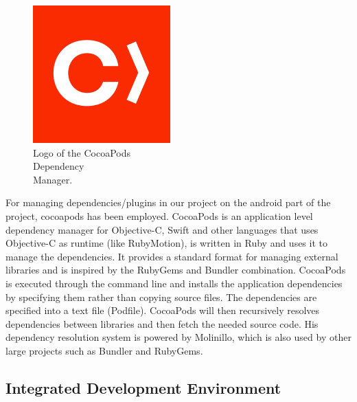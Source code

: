 \begin{figure} %
    \centering
    \includegraphics[width=\linewidth]{images/cocoapods.png}
    \caption{Logo of the CocoaPods\\Dependency\\Manager.}
\end{figure}

For managing dependencies/plugins in our project on the android part of the project, cocoapods has been employed. CocoaPods is an application level dependency manager for Objective-C, Swift and other languages that uses Objective-C as runtime (like RubyMotion), is written in Ruby and uses it to manage the dependencies. It provides a standard format for managing external libraries and is inspired by the RubyGems and Bundler combination. CocoaPods is executed through the command line and installs the application dependencies by specifying them rather than copying source files. The dependencies are specified into a text file (Podfile). CocoaPods will then recursively resolves dependencies between libraries and then fetch the needed source code. His dependency resolution system is powered by Molinillo, which is also used by other large projects such as Bundler and RubyGems\cite{CocoaPods}.

\subsection{Integrated Development Environment}
